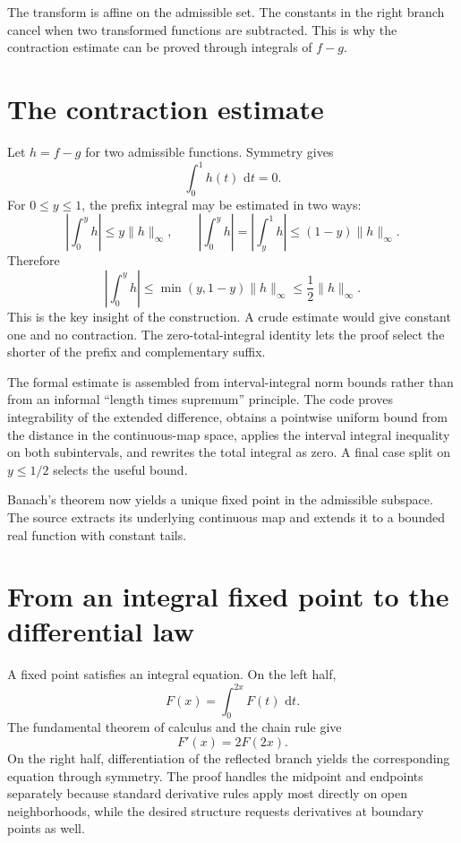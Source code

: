 \documentclass[11pt,oneside]{report}
\theoremstyle{definition}
\theoremstyle{remark}
\newcommand{\dd}{\,\mathrm{d}}
\begin{document}
The transform is affine on the admissible set.  The constants in the right branch cancel when two transformed functions are subtracted.  This is why the contraction estimate can be proved through integrals of \(f-g\).

\section{The contraction estimate}
Let \(h=f-g\) for two admissible functions.  Symmetry gives
\[
  \int_0^1 h(t)\,\dd t=0.
\]
For \(0\leq y\leq1\), the prefix integral may be estimated in two ways:
\[
  \left|\int_0^y h\right|\leq y\lVert h\rVert_\infty,
  \qquad
  \left|\int_0^y h\right|
   =\left|\int_y^1 h\right|
   \leq(1-y)\lVert h\rVert_\infty.
\]
Therefore
\[
  \left|\int_0^y h\right|
  \leq \min(y,1-y)\lVert h\rVert_\infty
  \leq\frac12\lVert h\rVert_\infty.
\]
This is the key insight of the construction.  A crude estimate would give constant one and no contraction.  The zero-total-integral identity lets the proof select the shorter of the prefix and complementary suffix.

\begin{leanpattern}
The formal estimate is assembled from interval-integral norm bounds rather than from an informal ``length times supremum'' principle.  The code proves integrability of the extended difference, obtains a pointwise uniform bound from the distance in the continuous-map space, applies the interval integral inequality on both subintervals, and rewrites the total integral as zero.  A final case split on \(y\leq1/2\) selects the useful bound.
\end{leanpattern}

Banach's theorem now yields a unique fixed point in the admissible subspace.  The source extracts its underlying continuous map and extends it to a bounded real function with constant tails.

\section{From an integral fixed point to the differential law}
A fixed point satisfies an integral equation.  On the left half,
\[
  F(x)=\int_0^{2x}F(t)\,\dd t.
\]
The fundamental theorem of calculus and the chain rule give
\[
  F'(x)=2F(2x).
\]
On the right half, differentiation of the reflected branch yields the corresponding equation through symmetry.  The proof handles the midpoint and endpoints separately because standard derivative rules apply most directly on open neighborhoods, while the desired structure requests derivatives at boundary points as well.
\end{document}

